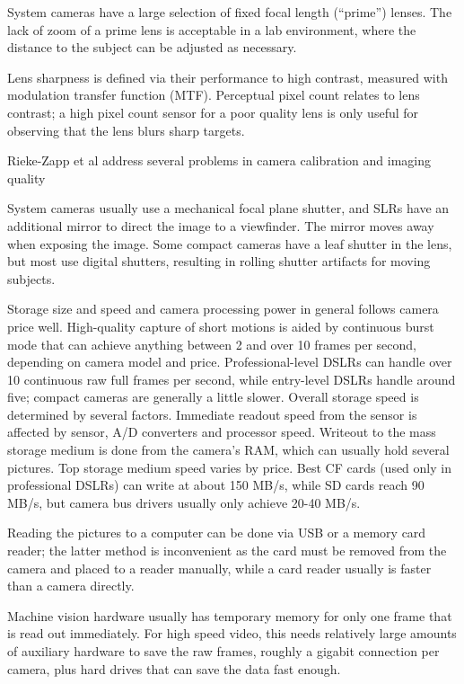 System cameras have a large selection of fixed focal length (``prime'') lenses.
The lack of zoom of a prime lens is acceptable in a lab environment, where the distance to the subject can be adjusted as necessary.

Lens sharpness is defined via their performance to high contrast, measured with modulation transfer function (MTF).
Perceptual pixel count relates to lens contrast; a high pixel count sensor for a poor quality lens is only useful for observing that the lens blurs sharp targets.

Rieke-Zapp et al \cite{rieke2009evaluation} address several problems in camera calibration and imaging quality


System cameras usually use a mechanical focal plane shutter, and SLRs have an additional mirror to direct the image to a viewfinder.
The mirror moves away when exposing the image.
Some compact cameras have a leaf shutter in the lens, but most use digital shutters, resulting in rolling shutter artifacts for moving subjects.

Storage size and speed and camera processing power in general follows camera price well.
High-quality capture of short motions is aided by continuous burst mode that can achieve anything between 2 and over 10 frames per second, depending on camera model and price.
Professional-level DSLRs can handle over 10 continuous raw full frames per second, while entry-level DSLRs handle around five;
compact cameras are generally a little slower.
Overall storage speed is determined by several factors.
Immediate readout speed from the sensor is affected by sensor, A/D converters and processor speed.
Writeout to the mass storage medium is done from the camera's RAM, which can usually hold several pictures.
Top storage medium speed varies by price.
Best CF cards (used only in professional DSLRs) can write at about 150 MB/s, while SD cards reach 90 MB/s, but camera bus drivers usually only achieve 20-40 MB/s. %

Reading the pictures to a computer can be done via USB or a memory card reader; the latter method is inconvenient as the card must be removed from the camera and placed to a reader manually, while a card reader usually is faster than a camera directly.

Machine vision hardware usually has temporary memory for only one frame that is read out immediately.
For high speed video, this needs relatively large amounts of auxiliary hardware to save the raw frames, roughly a gigabit connection per camera, plus hard drives that can save the data fast enough.

